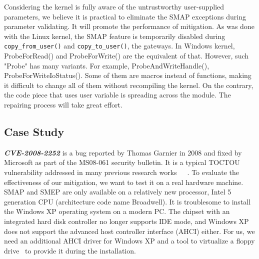 Considering the kernel is fully aware of the untrustworthy user-supplied parameters, we believe it is practical to eliminate the SMAP exceptions during parameter validating. It will promote the performance of mitigation. As was done with the Linux kernel, the SMAP feature is temporarily disabled during \texttt{copy\_from\_user()} and \texttt{copy\_to\_user()}, the gateways. In Windows kernel, ProbeForRead() and ProbeForWrite() are the equivalent of that. However, such "Probe" has many variants. For example, ProbeAndWriteHandle(), ProbeForWriteIoStatus(). Some of them are macros instead of functions, making it difficult to change all of them without recompiling the kernel. On the contrary, the code piece that uses user variable is spreading across the module. The repairing process will take great effort. 

\subsection{Case Study}


\textbf{\textit{CVE-2008-2252}} is a bug reported by Thomas Garnier in 2008 and fixed by Microsoft as part of the MS08-061 security bulletin.  It is a typical TOCTOU vulnerability addressed in many previous research works~\cite{serna2008ms08}~\cite{wang2019dftracker}~\cite{jurczyk2013identifying}. To evaluate the effectiveness of our mitigation, we want to test it on a real hardware machine. SMAP and SMEP are only available on a relatively new processor, Intel 5 generation CPU (architecture code name Broadwell). It is troublesome to install the Windows XP operating system on a modern PC. The chipset with an integrated hard disk controller no longer supports IDE mode, and Windows XP does not support the advanced host controller interface (AHCI) either. For us, we need an additional AHCI driver for Windows XP and a tool to virtualize a floppy drive~\cite{installxpskylake} to provide it during the installation.

